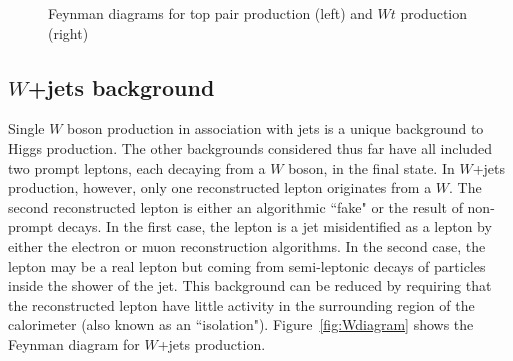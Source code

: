 \begin{figure}[h!]
  \centering
  \captionsetup{justification=centering}

  \hspace{20pt}
  \caption{Feynman diagrams for top pair production (left) and $Wt$ production (right)}
  \label{fig:Topdiagram}
\end{figure}

\subsection{$W$+jets background}

Single $W$ boson production in association with jets is a unique background to Higgs production. The other backgrounds considered thus far have all included two prompt leptons, each decaying from a $W$ boson, in the final state. In $W$+jets production, however, only one reconstructed lepton originates from a $W$. The second reconstructed lepton is either an algorithmic ``fake" or the result of non-prompt decays. In the first case, the lepton is a jet misidentified as a lepton by either the electron or muon reconstruction algorithms. In the second case, the lepton may be a real lepton but coming from semi-leptonic decays of particles inside the shower of the jet. This background can be reduced by requiring that the reconstructed lepton have little activity in the surrounding region of the calorimeter (also known as an ``isolation"). Figure~\ref{fig:Wdiagram} shows the Feynman diagram for $W$+jets production. 

